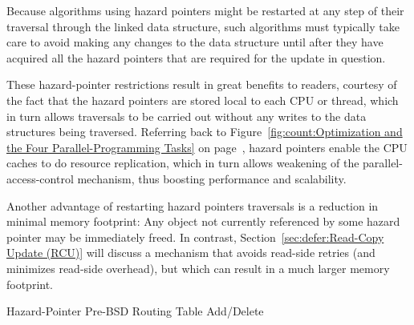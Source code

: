 \QuickQuizEnd

Because algorithms using hazard pointers might be restarted at any
step of their traversal through the linked data structure, such algorithms
must typically take care to avoid making any changes to the data
structure until after they have acquired all the hazard pointers that
are required for the update in question.

\QuickQuizEnd

These hazard-pointer restrictions result in great benefits to readers,
courtesy of the fact that the hazard pointers are stored local to each
CPU or thread, which in turn allows traversals to be carried out without
any writes to the data structures being traversed.
Referring back to
Figure~\ref{fig:count:Optimization and the Four Parallel-Programming Tasks}
on
page~\pageref{fig:count:Optimization and the Four Parallel-Programming Tasks},
hazard pointers enable the CPU caches to do resource replication, which
in turn allows weakening of the parallel-access-control mechanism,
thus boosting performance and scalability.

Another advantage of restarting hazard pointers traversals is a reduction in
minimal memory footprint:
Any object not currently referenced by some hazard pointer may be
immediately freed.
In contrast,
Section~\ref{sec:defer:Read-Copy Update (RCU)}
will discuss a mechanism that avoids read-side retries (and minimizes
read-side overhead), but which can result in a much larger memory
footprint.

\begin{listing}[tbp]

\caption{Hazard-Pointer Pre-BSD Routing Table Add\slash Delete}
\label{lst:defer:Hazard-Pointer Pre-BSD Routing Table Add/Delete}
\end{listing}

